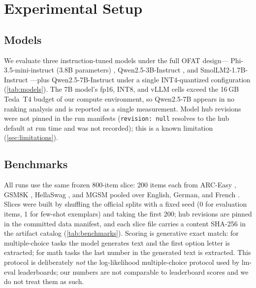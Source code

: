 \section{Experimental Setup}
\label{sec:setup}

\subsection{Models}
We evaluate three instruction-tuned models under the full OFAT design---
Phi-3.5-mini-instruct (3.8B parameters) \citep{abdin2024phi3},
Qwen2.5-3B-Instruct \citep{yang2024qwen25}, and
SmolLM2-1.7B-Instruct \citep{allal2025smollm2}---plus
Qwen2.5-7B-Instruct under a single INT4-quantized configuration
(\cref{tab:models}). The 7B model's fp16, INT8, and vLLM cells exceed the
16\,GB Tesla~T4 budget of our compute environment, so Qwen2.5-7B appears in
no ranking analysis and is reported as a single measurement. Model hub
revisions were not pinned in the run manifests (\texttt{revision: null}
resolves to the hub default at run time and was not recorded); this is a
known limitation (\cref{sec:limitations}).

\subsection{Benchmarks}
\label{sec:benchmarks}
All runs use the same frozen 800-item slice: 200 items each from ARC-Easy
\citep{clark2018think}, GSM8K \citep{cobbe2021training}, HellaSwag
\citep{zellers2019hellaswag}, and MGSM pooled over English, German, and
French \citep{shi2022language}. Slices were built by shuffling the official
splits with a fixed seed (0 for evaluation items, 1 for few-shot exemplars)
and taking the first 200; hub revisions are pinned in the committed data
manifest, and each slice file carries a content SHA-256 in the artifact
catalog (\cref{tab:benchmarks}). Scoring is generative exact match: for
multiple-choice tasks the model generates text and the first option letter
is extracted; for math tasks the last number in the generated text is
extracted. This protocol is deliberately \emph{not} the log-likelihood
multiple-choice protocol used by lm-eval leaderboards; our numbers are not
comparable to leaderboard scores and we do not treat them as such.

